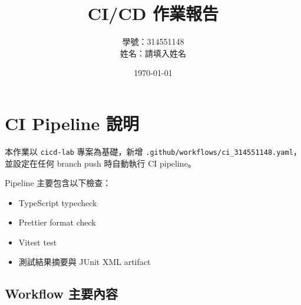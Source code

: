 \documentclass[12pt,a4paper]{article}
\title{CI/CD 作業報告}
\author{學號：314551148 \\ 姓名：請填入姓名}
\date{\today}
\begin{document}
\maketitle

\section{CI Pipeline 說明}

本作業以 \texttt{cicd-lab} 專案為基礎，新增
\texttt{.github/workflows/ci\_314551148.yaml}，並設定在任何 branch push 時自動執行 CI pipeline。

Pipeline 主要包含以下檢查：

\begin{itemize}[noitemsep]
  \item TypeScript typecheck
  \item Prettier format check
  \item Vitest test
  \item 測試結果摘要與 JUnit XML artifact
\end{itemize}

\subsection{Workflow 主要內容}
\end{document}
